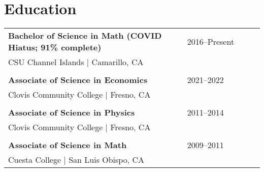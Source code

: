 \section*{Education}
\begin{tabular}{p{0.7\linewidth}p{0.3\linewidth}}
\textbf{Bachelor of Science in Math (COVID Hiatus; 91\% complete)} & 2016--Present \\
CSU Channel Islands | Camarillo, CA & \\
\\
\textbf{Associate of Science in Economics} & 2021--2022 \\
Clovis Community College | Fresno, CA & \\
\\
\textbf{Associate of Science in Physics} & 2011--2014 \\
Clovis Community College | Fresno, CA & \\
\\
\textbf{Associate of Science in Math} & 2009--2011 \\
Cuesta College | San Luis Obispo, CA &
\end{tabular}
